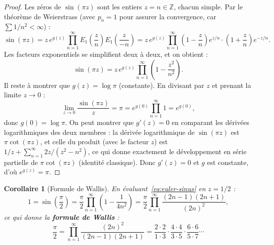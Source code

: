 \documentclass[12pt,a4paper,openany]{book}
\theoremstyle{definition}
\theoremstyle{plain}
\newtheorem{corollaire}[definition]{Corollaire}
\theoremstyle{remark}
\newcommand{\Z}{\mathbb{Z}}
\DeclareMathOperator{\re}{Re}
\DeclareMathOperator{\im}{Im}
\begin{document}
\begin{proof}
Les zéros de $\sin(\pi z)$ sont les entiers $z = n \in \Z$, chacun simple.
Par le théorème de Weierstrass (avec $p_n = 1$ pour assurer la convergence,
car $\sum 1/n^2 < \infty$) :
\[
  \sin(\pi z) = z \, e^{g(z)} \prod_{n=1}^{\infty}
  E_1\!\left(\frac{z}{n}\right) E_1\!\left(\frac{z}{-n}\right)
  = z \, e^{g(z)} \prod_{n=1}^{\infty}
  \left(1 - \frac{z}{n}\right)e^{z/n} \cdot
  \left(1 + \frac{z}{n}\right)e^{-z/n}.
\]
Les facteurs exponentiels se simplifient deux à deux, et on obtient :
\[
  \sin(\pi z) = z \, e^{g(z)} \prod_{n=1}^{\infty}
  \left(1 - \frac{z^2}{n^2}\right).
\]
Il reste à montrer que $g(z) = \log \pi$ (constante). En divisant par $z$
et prenant la limite $z \to 0$ :
\[
  \lim_{z \to 0} \frac{\sin(\pi z)}{z} = \pi
  = e^{g(0)} \prod_{n=1}^{\infty} 1 = e^{g(0)},
\]
donc $g(0) = \log \pi$. On peut montrer que $g'(z) = 0$ en comparant les
dérivées logarithmiques des deux membres : la dérivée logarithmique de
$\sin(\pi z)$ est $\pi\cot(\pi z)$, et celle du produit (avec le facteur $z$)
est $1/z + \sum_{n=1}^{\infty} 2z/(z^2 - n^2)$, ce qui donne exactement
le développement en série partielle de $\pi\cot(\pi z)$ (identité classique).
Donc $g'(z) = 0$ et $g$ est constante, d'où $e^{g(z)} = \pi$.
\end{proof}

\begin{corollaire}[Formule de Wallis]\label{cor:wallis}
En évaluant~\eqref{eq:euler-sinus} en $z = 1/2$ :
\[
  1 = \sin\!\left(\frac{\pi}{2}\right)
  = \frac{\pi}{2} \prod_{n=1}^{\infty}
  \left(1 - \frac{1}{4n^2}\right)
  = \frac{\pi}{2} \prod_{n=1}^{\infty}
  \frac{(2n-1)(2n+1)}{(2n)^2},
\]
ce qui donne la \textbf{formule de Wallis} :
\[
  \frac{\pi}{2} = \prod_{n=1}^{\infty} \frac{(2n)^2}{(2n-1)(2n+1)}
  = \frac{2 \cdot 2}{1 \cdot 3} \cdot \frac{4 \cdot 4}{3 \cdot 5}
  \cdot \frac{6 \cdot 6}{5 \cdot 7} \cdots
\]
\end{corollaire}

\begin{center}
\end{center}
\end{document}
